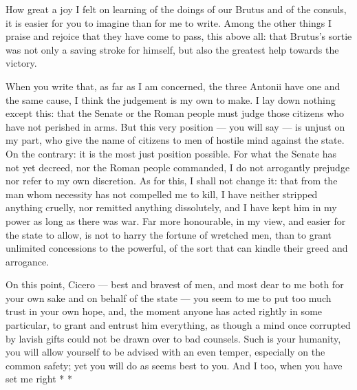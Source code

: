 

 How great a joy I felt on learning of the doings of our Brutus and of the consuls, it is easier for you to imagine than for me to write. Among the other things I praise and rejoice that they have come to pass, this above all: that Brutus's sortie was not only a saving stroke for himself, but also the greatest help towards the victory.

 When you write that, as far as I am concerned, the three Antonii have one and the same cause, I think the judgement is my own to make. I lay down nothing except this: that the Senate or the Roman people must judge those citizens who have not perished in arms. But this very position --- you will say --- is unjust on my part, who give the name of citizens to men of hostile mind against the state. On the contrary: it is the most just position possible. For what the Senate has not yet decreed, nor the Roman people commanded, I do not arrogantly prejudge nor refer to my own discretion. As for this, I shall not change it: that from the man whom necessity has not compelled me to kill, I have neither stripped anything cruelly, nor remitted anything dissolutely, and I have kept him in my power as long as there was war. Far more honourable, in my view, and easier for the state to allow, is not to harry the fortune of wretched men, than to grant unlimited concessions to the powerful, of the sort that can kindle their greed and arrogance.

 On this point, Cicero --- best and bravest of men, and most dear to me both for your own sake and on behalf of the state --- you seem to me to put too much trust in your own hope, and, the moment anyone has acted rightly in some particular, to grant and entrust him everything, as though a mind once corrupted by lavish gifts could not be drawn over to bad counsels. Such is your humanity, you will allow yourself to be advised with an even temper, especially on the common safety; yet you will do as seems best to you. And I too, when you have set me right * *
